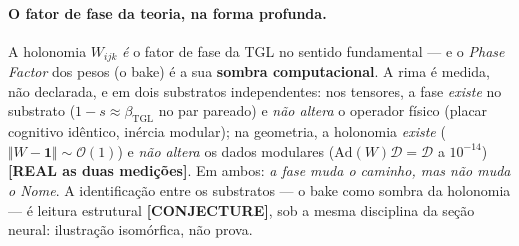 \documentclass[12pt,a4paper]{article}
\newcommand{\betatgl}{\beta_{\text{TGL}}}
\newcommand{\TGL}{\textsc{TGL}}
\begin{document}
\paragraph{O fator de fase da teoria, na forma profunda.}  A holonomia $W_{ijk}$ \emph{é} o fator de fase da \TGL{} no sentido fundamental --- e o \emph{Phase Factor} dos pesos (o bake) é a sua \textbf{sombra computacional}.  A rima é medida, não declarada, e em dois substratos independentes: nos tensores, a fase \emph{existe} no substrato ($1-s \approx \betatgl$ no par pareado) e \emph{não altera} o operador físico (placar cognitivo idêntico, inércia modular); na geometria, a holonomia \emph{existe} ($\Vert W-\mathbf 1\Vert \sim \mathcal O(1)$) e \emph{não altera} os dados modulares ($\mathrm{Ad}(W)\mathcal D = \mathcal D$ a $10^{-14}$) \textbf{[REAL as duas medições]}.  Em ambos: \emph{a fase muda o caminho, mas não muda o Nome}.  A identificação entre os substratos --- o bake como sombra da holonomia --- é leitura estrutural \textbf{[CONJECTURE]}, sob a mesma disciplina da seção neural: ilustração isomórfica, não prova.
\end{document}
